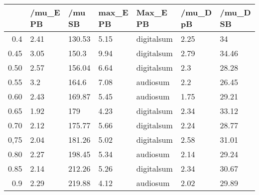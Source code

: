 \begin{table}[ht]
\centering
\begin{tabular}{rllllll}
  \hline
 & /mu\_E PB & /mu SB & max\_E PB & Max\_E PB & /mu\_D pB & /mu\_D SB \\ 
  \hline
0.4 & 2.41 & 130.53 & 5.15 & digitalsum & 2.25 & 34 \\ 
  0.45 & 3.05 & 150.3 & 9.94 & digitalsum & 2.79 & 34.46 \\ 
  0.50 & 2.57 & 156.04 & 6.64 & digitalsum & 2.3 & 28.28 \\ 
  0.55 & 3.2 & 164.6 & 7.08 & audiosum & 2.2 & 26.45 \\ 
  0.60 & 2.43 & 169.87 & 5.45 & audiosum & 1.75 & 29.21 \\ 
  0.65 & 1.92 & 179 & 4.23 & digitalsum & 2.34 & 33.12 \\ 
  0.70 & 2.12 & 175.77 & 5.66 & digitalsum & 2.24 & 28.77 \\ 
  0,75 & 2.04 & 181.26 & 5.02 & digitalsum & 2.58 & 31.01 \\ 
  0.80 & 2.27 & 198.45 & 5.34 & audiosum & 2.14 & 29.24 \\ 
  0.85 & 2.14 & 212.26 & 5.26 & digitalsum & 2.34 & 30.67 \\ 
  0.9 & 2.29 & 219.88 & 4.12 & audiosum & 2.02 & 29.89 \\ 
   \hline
\end{tabular}
\end{table}
